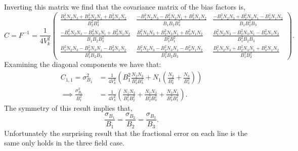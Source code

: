 \documentclass{aastex62}
\newcommand{\beq}{\begin{equation}}
\newcommand{\eeq}{\end{equation}}
\begin{document}
Inverting this matrix we find that the covariance matrix of the bias factors is,
\beq \label{eq:covmat_tf_wn}
C = F^{-1} = \frac{1}{4V_k^2}
\begin{pmatrix}
\frac{B_1^2N_2N_3 + B_2^2N_3N_1 + B_3^2N_1N_2}{B_2^2B_3^2} & \frac{-B_1^2N_2N_3 - B_2^2N_3N_1 + B_3^2N_1N_2}{B_1B_2B_3^2} & \frac{-B_1^2N_2N_3 + B_2^2N_3N_1 - B_3^2N_1N_2}{B_1B_2^2B_3} \\
\frac{-B_1^2N_2N_3 - B_2^2N_3N_1 + B_3^2N_1N_2}{B_1B_2B_3^2} & \frac{B_1^2N_2N_3 + B_2^2N_3N_1 + B_3^2N_1N_2}{B_3^2B_1^2} & \frac{B_1^2N_2N_3 - B_2^2N_3N_1 - B_3^2N_1N_2}{B_1^2B_2B_3} \\
\frac{B_1^2N_2N_3 - B_2^2N_3N_1 - B_3^2N_1N_2}{B_1^2B_2B_3} & \frac{B_1^2N_2N_3 - B_2^2N_3N_1 - B_3^2N_1N_2}{B_1^2B_2B_3} & \frac{B_1^2N_2N_3 + B_2^2N_3N_1 + B_3^2N_1N_2}{B_1^2B_2^2}
\end{pmatrix}
\text{.}
\eeq
Examining the diagonal components we have that:
\beq \label{eq:var_bias_tf_wn}
\begin{split}
C_{1,1} = \sigma_{B_1}^2 &= \frac{1}{4V_k^2} \left( B_1^2 \frac{N_2N_3}{B_2^2B_3^2} + N_1(\frac{N_2}{B_2^2} + \frac{N_3}{B_3^2}) \right) \\
\implies \frac{\sigma_{B_1}^2}{B_1^2} &= \frac{1}{4V_k^2} \left( \frac{N_1N_2}{B_1^2B_2^2} + \frac{N_2N_3}{B_2^2B_3^2} + \frac{N_3N_1}{B_3^2B_1^2} \right)\text{.}
\end{split}
\eeq
The symmetry of this result implies that,
\beq \label{eq:frac_error_same}
\frac{\sigma_{B_1}}{B_1} = \frac{\sigma_{B_2}}{B_2} = 
\frac{\sigma_{B_3}}{B_3}\text{.}
\eeq
Unfortunately the surprising result that the fractional error on each line is
the same only holds in the three field case.
\end{document}
